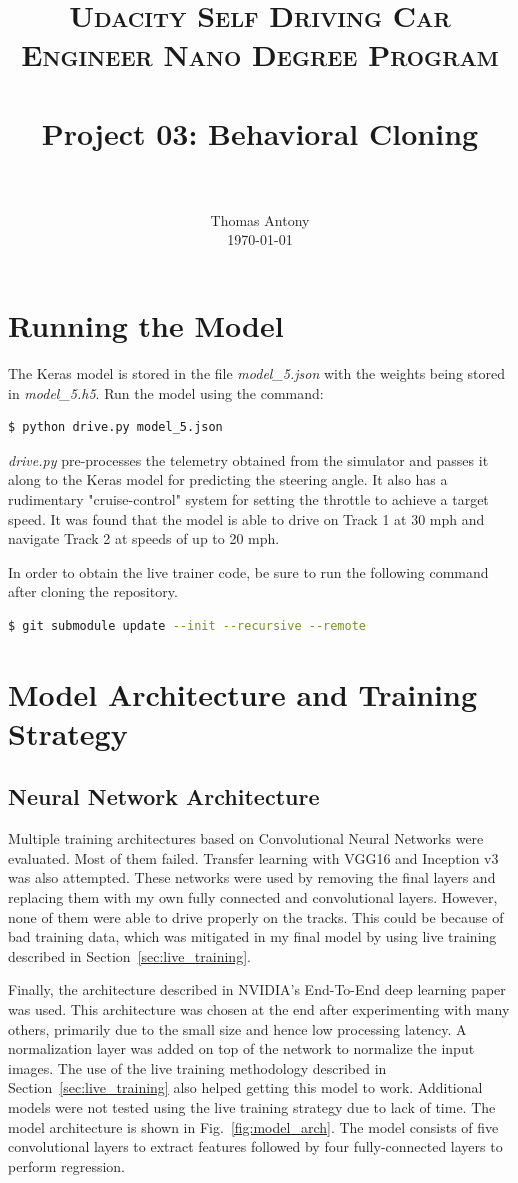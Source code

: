 \documentclass[paper=letter, fontsize=11pt]{scrartcl}
\title{
		\usefont{OT1}{bch}{b}{n}
		\normalfont \normalsize \textsc{Udacity Self Driving Car Engineer Nano Degree Program} \\ [25pt]
		\horrule{0.5pt} \\[0.4cm]
		\huge Project 03: Behavioral Cloning \\
		\horrule{2pt} \\[0.5cm]
}
\author{
		\normalfont 								\normalsize
        Thomas Antony\\[-3pt]		\normalsize
        \today
}
\date{}
\numberwithin{equation}{section}		%
\numberwithin{figure}{section}			%
\numberwithin{table}{section}				%
\begin{document}
\maketitle
\section{Running the Model}
The Keras model is stored in the file \emph{model\_5.json} with the weights being stored in \emph{model\_5.h5}. Run the model using the command:

\begin{lstlisting}[language=bash]
$ python drive.py model_5.json
\end{lstlisting}

\texttt{}

\emph{drive.py} pre-processes the telemetry obtained from the simulator and passes it along to the Keras model for predicting the steering angle. It also has a rudimentary "cruise-control" system for setting the throttle to achieve a target speed. It was found that the model is able to drive on Track 1 at 30 mph and navigate Track 2 at speeds of up to 20 mph.

In order to obtain the live trainer code, be sure to run the following command after cloning the repository.

\begin{lstlisting}[language=bash]
$ git submodule update --init --recursive --remote
\end{lstlisting}

\section{Model Architecture and Training Strategy}

\subsection{Neural Network Architecture}
Multiple training architectures based on Convolutional Neural Networks were evaluated. Most of them failed. Transfer learning with VGG16 and Inception v3 was also attempted. These networks were used by removing the final layers and replacing them with my own fully connected and convolutional layers. However, none of them were able to drive properly on the tracks. This could be because of bad training data, which was mitigated in my final model by using live training described in Section~\ref{sec:live_training}.

Finally, the architecture described in NVIDIA's End-To-End deep learning paper\cite{nvidia:endtoend2016} was used. This architecture was chosen at the end after experimenting with many others, primarily due to the small size and hence low processing latency. A normalization layer was added on top of the network to normalize the input images. The use of the live training methodology described in Section~\ref{sec:live_training} also helped getting this model to work. Additional models were not tested using the live training strategy due to lack of time. The model architecture is shown in Fig.~\ref{fig:model_arch}. The model consists of five convolutional layers to extract features followed by four fully-connected layers to perform regression. 
\end{document}
